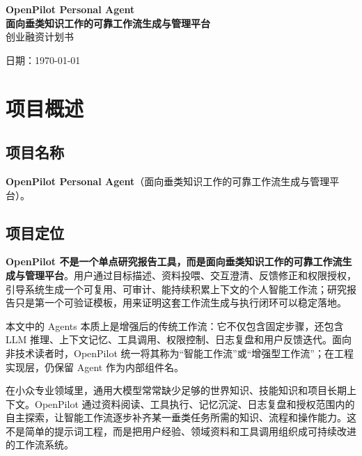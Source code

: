 \documentclass[12pt,a4paper]{ctexart}
\begin{document}
\begin{titlepage}
  \begin{center}
    \vspace*{3cm}

    {\huge\bfseries OpenPilot Personal Agent}\\[0.5cm]
    {\LARGE\bfseries 面向垂类知识工作的可靠工作流生成与管理平台}\\[1cm]
    {\large 创业融资计划书}\\[1.5cm]

    \vfill

    {\large 日期：\today}\\[0.3cm]

    \vspace*{2cm}
  \end{center}
\end{titlepage}

\tableofcontents
\newpage

\section{项目概述}

\subsection{项目名称}
\textbf{OpenPilot Personal Agent}（面向垂类知识工作的可靠工作流生成与管理平台）。

\subsection{项目定位}

\textbf{OpenPilot 不是一个单点研究报告工具，而是面向垂类知识工作的可靠工作流生成与管理平台}。用户通过目标描述、资料投喂、交互澄清、反馈修正和权限授权，引导系统生成一个可复用、可审计、能持续积累上下文的个人智能工作流；研究报告只是第一个可验证模板，用来证明这套工作流生成与执行闭环可以稳定落地。

本文中的 Agents 本质上是增强后的传统工作流：它不仅包含固定步骤，还包含 LLM 推理、上下文记忆、工具调用、权限控制、日志复盘和用户反馈迭代。面向非技术读者时，OpenPilot 统一将其称为“智能工作流”或“增强型工作流”；在工程实现层，仍保留 Agent 作为内部组件名。

在小众专业领域里，通用大模型常常缺少足够的世界知识、技能知识和项目长期上下文。OpenPilot 通过资料阅读、工具执行、记忆沉淀、日志复盘和授权范围内的自主探索，让智能工作流逐步补齐某一垂类任务所需的知识、流程和操作能力。这不是简单的提示词工程，而是把用户经验、领域资料和工具调用组织成可持续改进的工作流系统。
\end{document}
